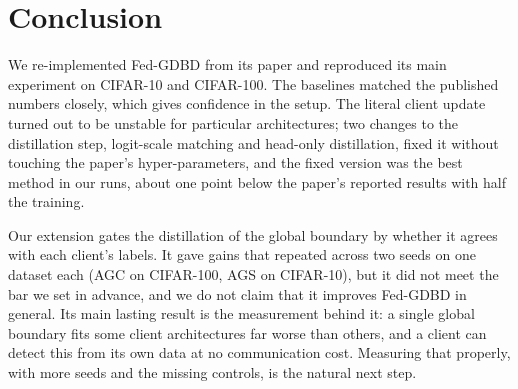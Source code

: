 \section{Conclusion}

We re-implemented Fed-GDBD from its paper and reproduced its main experiment on CIFAR-10 and CIFAR-100. The baselines matched the published numbers closely, which gives confidence in the setup. The literal client update turned out to be unstable for particular architectures; two changes to the distillation step, logit-scale matching and head-only distillation, fixed it without touching the paper's hyper-parameters, and the fixed version was the best method in our runs, about one point below the paper's reported results with half the training.

Our extension gates the distillation of the global boundary by whether it agrees with each client's labels. It gave gains that repeated across two seeds on one dataset each (AGC on CIFAR-100, AGS on CIFAR-10), but it did not meet the bar we set in advance, and we do not claim that it improves Fed-GDBD in general. Its main lasting result is the measurement behind it: a single global boundary fits some client architectures far worse than others, and a client can detect this from its own data at no communication cost. Measuring that properly, with more seeds and the missing controls, is the natural next step.
